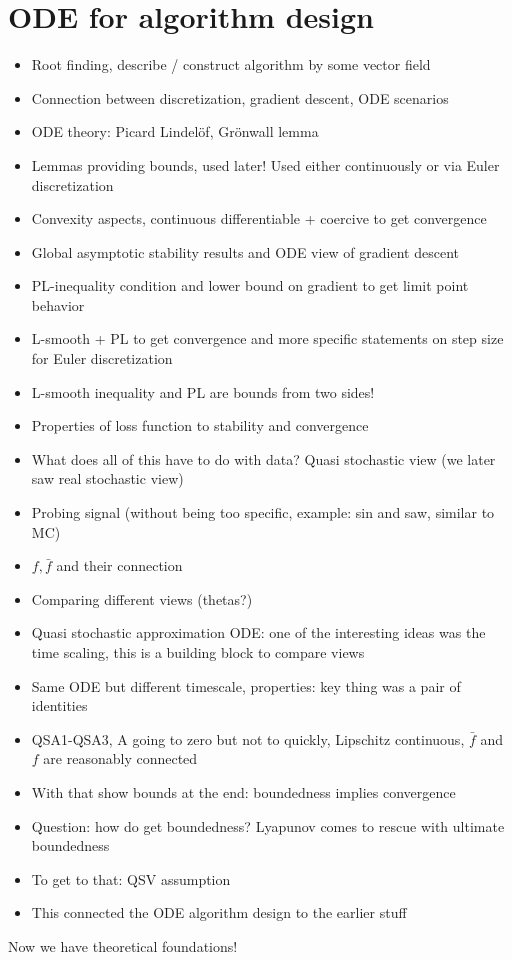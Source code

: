 \section{ODE for algorithm design}
\begin{itemize}
    \item Root finding, describe / construct algorithm by some vector field 
    \item Connection between discretization, gradient descent, ODE scenarios
    \item ODE theory: Picard Lindelöf, Grönwall lemma
    \item Lemmas providing bounds, used later! Used either continuously or via Euler discretization 
    \item Convexity aspects, continuous differentiable + coercive to get convergence 
    \item Global asymptotic stability results and ODE view of gradient descent 
    \item PL-inequality condition and lower bound on gradient to get limit point behavior
    \item L-smooth + PL to get convergence and more specific statements on step size for Euler discretization
    \item L-smooth inequality and PL are bounds from two sides! 
    \item Properties of loss function to stability and convergence 
    \item What does all of this have to do with data? Quasi stochastic view (we later saw real stochastic view)
    \item Probing signal (without being too specific, example: sin and saw, similar to MC)
    \item  \(f,\bar{f}\) and their connection
    \item Comparing different views (thetas?)
    \item Quasi stochastic approximation ODE: one of the interesting ideas was the time scaling, this is a building block to compare views
    \item Same ODE but different timescale, properties: key thing was a pair of identities
    \item QSA1-QSA3, A going to zero but not to quickly, Lipschitz continuous, \(\bar{f}\) and \(f\) are reasonably connected 
    \item With that show bounds at the end: boundedness implies convergence  
    \item Question: how do get boundedness? Lyapunov comes to rescue with ultimate boundedness
    \item To get to that: QSV assumption
    \item This connected the ODE algorithm design to the earlier stuff
\end{itemize}
Now we have theoretical foundations!


